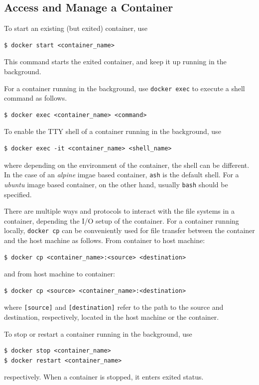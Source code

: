 \subsection{Access and Manage a Container}

To start an existing (but exited) container, use
\begin{lstlisting}
$ docker start <container_name>
\end{lstlisting}
This command starts the exited container, and keep it up running in the background.

For a container running in the background, use \verb|docker exec| to execute a shell command as follows.
\begin{lstlisting}
$ docker exec <container_name> <command>
\end{lstlisting}

To enable the TTY shell of a container running in the background, use
\begin{lstlisting}
$ docker exec -it <container_name> <shell_name>
\end{lstlisting}
where depending on the environment of the container, the shell can be different. In the case of an \textit{alpine} imgae based container, \verb|ash| is the default shell. For a \textit{ubuntu} image based container, on the other hand, usually \verb|bash| should be specified.

There are multiple ways and protocols to interact with the file systems in a container, depending the I/O setup of the container. For a container running locally, \verb|docker cp| can be conveniently used for file transfer between the container and the host machine as follows. From container to host machine:
\begin{lstlisting}
$ docker cp <container_name>:<source> <destination>
\end{lstlisting}
and from host machine to container:
\begin{lstlisting}
$ docker cp <source> <container_name>:<destination>
\end{lstlisting}
where \verb|[source]| and \verb|[destination]| refer to the path to the source and destination, respectively, located in the host machine or the container.

To stop or restart a container running in the background, use
\begin{lstlisting}
$ docker stop <container_name>
$ docker restart <container_name>
\end{lstlisting}
respectively. When a container is stopped, it enters exited status.

